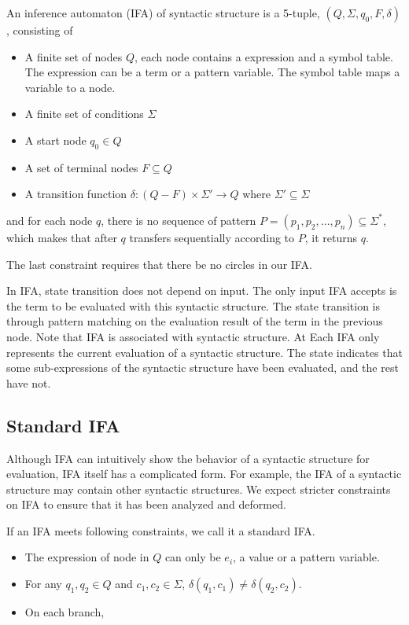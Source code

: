 \begin{Def}

An inference automaton (IFA) of syntactic structure  is a 5-tuple, $(Q, \Sigma, q_0, F, \delta)$, consisting of

\begin{itemize}
    \item A finite set of nodes $Q$, each node contains a expression and a symbol table. The expression can be a term or a pattern variable. The symbol table maps a variable to a node.
    \item A finite set of conditions $\Sigma$
    \item A start node $q_0 \in Q$
    \item A set of terminal nodes $F \subseteq Q$
    \item A transition function $\delta: (Q-F) \times \Sigma' \to Q$ where $\Sigma' \subseteq \Sigma$
\end{itemize}


and for each node $q$, there is no sequence of pattern $P = (p_1,p_2,\ldots,p_n)\subseteq \Sigma^*$, which makes that after $q$ transfers sequentially according to $P$, it returns $q$.

\end{Def}

The last constraint requires that there be no circles in our IFA.

In IFA, state transition does not depend on input. The only input IFA accepts is the term to be evaluated with this syntactic structure. The state transition is through pattern matching on the evaluation result of the term in the previous node. Note that IFA is associated with syntactic structure. At Each IFA only represents the current evaluation of a syntactic structure. The state indicates that some
sub-expressions of the syntactic structure have been evaluated, and the rest have not.

\subsection{Standard IFA}

Although IFA can intuitively show the behavior of a syntactic structure for evaluation, IFA itself has a complicated form. For example, the IFA of a syntactic structure may contain other syntactic structures. We expect stricter constraints on IFA to ensure that it has been analyzed and deformed.

\begin{Def}
\label{def:stdifa}
If an IFA meets following constraints, we call it a standard IFA.
\begin{itemize}
    \item The expression of node in $Q$ can only be $e_i$, a value or a pattern variable.
    \item For any $q_1,q_2 \in Q$ and $c_1, c_2 \in \Sigma$, $\delta(q_1, c_1) \neq \delta(q_2, c_2)$.
    \item On each branch,
\end{itemize}
\end{Def}

